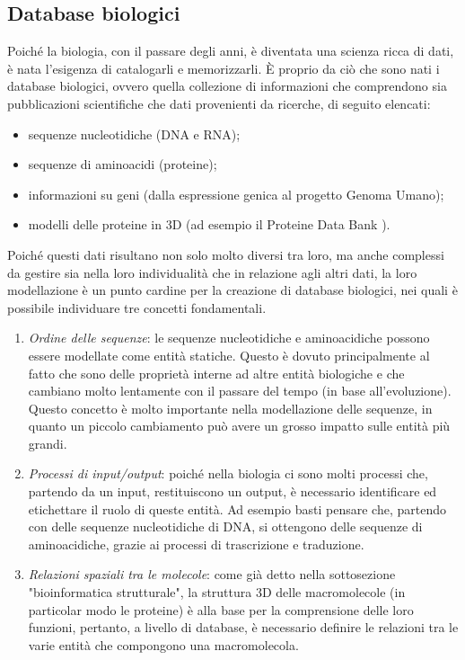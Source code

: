 \subsection{Database biologici}
Poiché la biologia, con il passare degli anni, è diventata una scienza ricca di dati, è nata l'esigenza di catalogarli e memorizzarli. \`E proprio da ciò che sono nati i database biologici, ovvero quella collezione di informazioni che comprendono sia pubblicazioni scientifiche che dati provenienti da ricerche, di seguito elencati:
\begin{itemize}
	\item sequenze nucleotidiche (DNA e RNA);
	\item sequenze di aminoacidi (proteine);
	\item informazioni su geni (dalla espressione genica al progetto Genoma Umano);
	\item modelli delle proteine in 3D (ad esempio il Proteine Data Bank \cite{proteineDataBank}).
\end{itemize}
Poiché questi dati risultano non solo molto diversi tra loro, ma anche complessi da gestire sia nella loro individualità che in relazione agli altri dati, la loro modellazione è un punto cardine per la creazione di database biologici, nei quali è possibile individuare tre concetti fondamentali.
\begin{enumerate}
	\item \textit{Ordine delle sequenze}: le sequenze nucleotidiche e aminoacidiche possono essere modellate come entità statiche. Questo è dovuto principalmente al fatto che sono delle proprietà interne ad altre entità biologiche e che cambiano molto lentamente con il passare del tempo (in base all'evoluzione).
	\newline
	Questo concetto è molto importante nella modellazione delle sequenze, in quanto un piccolo cambiamento può avere un grosso impatto sulle entità più grandi.
	\item \textit{Processi di input/output}: poiché nella biologia ci sono molti processi che, partendo da un input, restituiscono un output, è necessario identificare ed etichettare il ruolo di queste entità. Ad esempio basti pensare che, partendo con delle sequenze nucleotidiche di DNA, si ottengono delle sequenze di aminoacidiche, grazie ai processi di trascrizione e traduzione.
	\item \textit{Relazioni spaziali tra le molecole}: come già detto nella sottosezione "bioinformatica strutturale", la struttura 3D delle macromolecole (in particolar modo le proteine) è alla base per la comprensione delle loro funzioni, pertanto, a livello di database, è necessario definire le relazioni tra le varie entità che compongono una macromolecola.
\end{enumerate}
